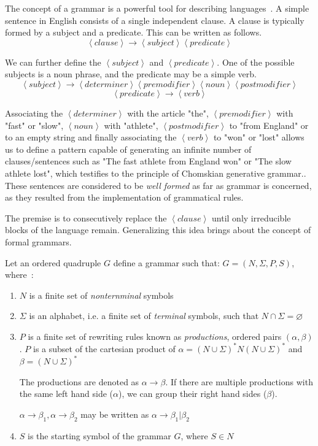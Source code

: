The concept of a grammar is a powerful tool for describing languages~\cite[p. 52]{Linz2016Introduction}. A simple sentence in English consists of a single independent clause. A clause is typically formed by a subject and a predicate. This can be written as follows.
$$ \left< clause \right> \rightarrow \left< subject \right> \left< predicate \right> $$

We can further define the $\left< subject \right>$ and $\left< predicate \right>$. One of the possible subjects is a noun phrase, and the predicate may be a simple verb.
$$\left< subject \right>   \rightarrow   \left< determiner \right>   \left< premodifier \right>    \left< noun \right>    \left< postmodifier \right>$$
$$\left< predicate \right> \rightarrow \left< verb \right>$$

Associating the $\left< determiner \right>$ with the article "the", $\left< premodifier \right>$ with "fast" or "slow", $\left< noun \right>$ with "athlete", $\left< postmodifier \right>$ to "from England" or to an empty string and finally associating the $\left< verb \right>$ to "won" or "lost" allows us to define a pattern capable of generating an infinite number of clauses/sentences such as "The fast athlete from England won" or "The slow athlete lost", which testifies to the principle of Chomskian generative grammar.. These sentences are considered to be \emph{well formed} as far as grammar is concerned, as they resulted from the implementation of grammatical rules.

The premise is to consecutively replace the $\left< clause \right>$ until only irreducible blocks of the language remain. Generalizing this idea brings about the concept of formal grammars.

\begin{definition}[Grammar]
\label{def:grammar}
Let an ordered quadruple $G$ define a grammar such that: $G=\left(N, \Sigma, P, S \right)$, where~\cite{Salomaa1987Formal}:
\begin{enumerate}
\item $N$ is a finite set of \emph{nonternminal} symbols
\item $\Sigma$ is an alphabet, i.e. a finite set of \emph{terminal} symbols, such that $N \cap \Sigma = \varnothing$
\item $P$ is a finite set of rewriting rules known as \emph{productions}, ordered pairs $\left( \alpha, \beta \right)$.
$P$ is a subset of the cartesian product of $\alpha = \left(N \cup \Sigma\right)^* N \left(N \cup \Sigma\right)^*$ and $\beta = \left(N \cup \Sigma\right)^*$


The productions are denoted as $\alpha \rightarrow \beta$.
If there are multiple productions with the same left hand side ($\alpha$), we can group their right hand sides ($\beta$).


$\alpha \rightarrow \beta_1, \alpha \rightarrow \beta_2$ may be written as $\alpha \rightarrow \beta_1 | \beta_2$

\item $S$ is the starting symbol of the grammar $G$, where $S \in N$
\end{enumerate}
\end{definition}

